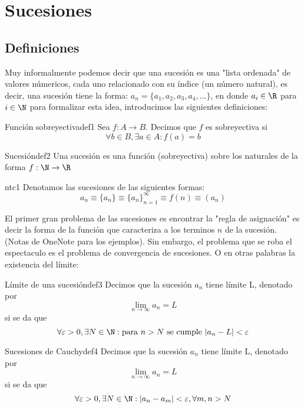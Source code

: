 \section{\Large Sucesiones}

\subsection{Definiciones}
Muy informalmente podemos decir que una sucesión es una "lista ordenada" de valores númericos, cada uno relacionado con su índice (un número natural), es decir, una sucesión tiene la forma: $a_n = \{a_1, a_2, a_3, a_4, ...\}$, en donde $a_i \in \R$ para $i \in \N$ para formalizar esta idea, introducimos las siguientes definiciones:

\begin{definicion}{Función sobreyectiva}{def1}
    Sea $f: A \to B$. Decimos que $f$ es sobreyectiva si 
    \[
        \forall b \in B, \exists a \in A: f(a) = b
    \]
\end{definicion}

\begin{definicion}{Sucesión}{def2}
    Una sucesión es una función (sobreyectiva) sobre los naturales de la forma $f: \N \to \R$ 
\end{definicion}

\begin{notacion}{}{ntc1}
    Denotamos las sucesiones de las siguientes formas:
    \[ 
        a_n \equiv \{a_n\} \equiv \{a_n\}_{n = 1}^{\infty} \equiv f(n) \equiv (a_n)
    \]
\end{notacion}

El primer gran problema de las sucesiones es encontrar la "regla de asignación" es decir la forma de la función que caracteriza a los terminos $n$ de la sucesión. (Notas de OneNote para los ejemplos). Sin embargo, el problema que se roba el espectaculo es el problema de convergencia de sucesiones. O en otras palabras la existencia del límite: 
    
\begin{definicion}{Límite de una sucesión}{def3}
    Decimos que la sucesión $a_n$ tiene límite L, denotado por
    \[ 
        \lim_{n \to \infty} a_n = L
    \]
    si se da que 
    \[ 
        \forall \varepsilon > 0, \exists N \in \N: \text{para } n > N \text{ se cumple } \lvert a_n - L \rvert < \varepsilon
    \]
\end{definicion}

\begin{definicion}{Sucesiones de Cauchy}{def4}
    Decimos que la sucesión $a_n$ tiene límite L, denotado por
    \[ 
        \lim_{n \to \infty} a_n = L
    \]
    si se da que 
    \[ 
        \forall \varepsilon > 0, \exists N \in \N: \lvert a_n - a_m \rvert < \varepsilon, \forall m,n > N 
    \]
\end{definicion}

